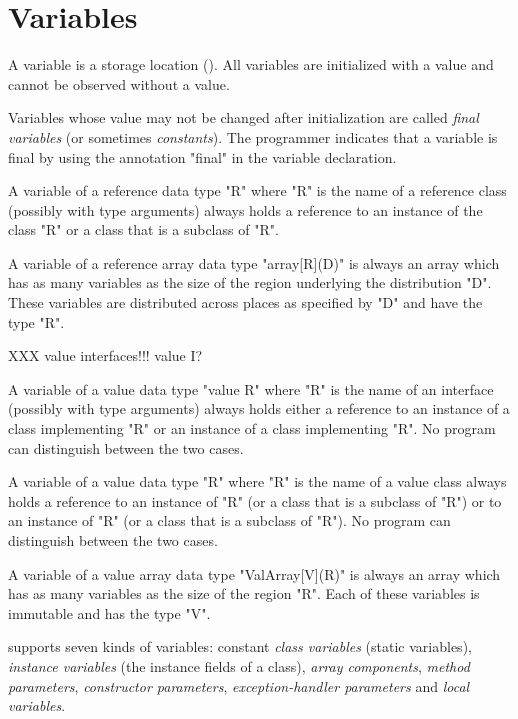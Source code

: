 
\chapter{Variables}\label{XtenVariables}

A variable is a storage location (). All
variables are initialized with a value and cannot be observed
without
a value.

Variables whose value may not be changed after initialization
are called {\em final variables} (or sometimes {\em constants}).
The programmer indicates that a variable is final by using the
annotation \xcd"final" in the variable declaration.


A variable of a reference data type \xcd"R" where \xcd"R" is the name
of a reference class (possibly with type arguments) always holds a
reference to an instance of the class \xcd"R" or a class that is a
subclass of \xcd"R". 

A variable of a reference array data type \xcd"array[R](D)" is always an
array which has as many variables as the size of the region underlying
the distribution \xcd"D". These variables are distributed across
places as specified by \xcd"D" and have the type \xcd"R".


XXX value interfaces!!!  value I?

A variable of a value data type \xcd"value R" where \xcd"R" is the
name of an interface (possibly with type arguments) always holds
either a reference to an instance of a class implementing \xcd"R" or
an instance of a class implementing \xcd"R". No program can
distinguish between the two cases.

A variable of a value data type \xcd"R" where \xcd"R" is the name of a
value class always holds a reference to an instance of \xcd"R" (or a
class that is a subclass of \xcd"R") or to an instance of \xcd"R" (or a
class that is a subclass of \xcd"R"). No program can distinguish
between the two cases.

A variable of a value array data type \xcd"ValArray[V](R)" is always an
array which has as many variables as the size of the region \xcd"R".
Each of these variables is immutable and has the type \xcd"V".

\Xten{} supports seven kinds of variables: constant {\em class
variables} (static variables), {\em instance variables} (the instance
fields of a class), {\em array components}, {\em method parameters},
{\em constructor parameters}, {\em exception-handler parameters} and
{\em local variables}.

